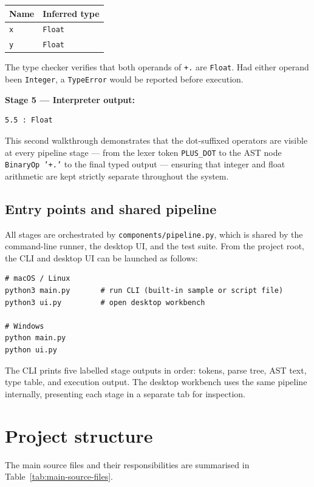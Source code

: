 \begin{table}[H]
\centering
\small
\begin{tabular}{@{} ll @{}}
\toprule
\textbf{Name} & \textbf{Inferred type} \\
\midrule
\texttt{x} & \texttt{Float} \\
\texttt{y} & \texttt{Float} \\
\bottomrule
\end{tabular}
\end{table}

\noindent The type checker verifies that both operands of \texttt{+.} are
\texttt{Float}. Had either operand been \texttt{Integer}, a \texttt{TypeError}
would be reported before execution.

\textbf{Stage 5 --- Interpreter output:}
\begin{lstlisting}
5.5 : Float
\end{lstlisting}

This second walkthrough demonstrates that the dot-suffixed operators are visible
at every pipeline stage --- from the lexer token \texttt{PLUS\_DOT} to the AST
node \texttt{BinaryOp '+.'} to the final typed output --- ensuring that integer
and float arithmetic are kept strictly separate throughout the system.

\subsection{Entry points and shared pipeline}
All stages are orchestrated by \texttt{components/pipeline.py}, which is shared
by the command-line runner, the desktop UI, and the test suite.
From the project root, the CLI and desktop UI can be launched as follows:

\begin{lstlisting}
# macOS / Linux
python3 main.py       # run CLI (built-in sample or script file)
python3 ui.py         # open desktop workbench

# Windows
python main.py
python ui.py
\end{lstlisting}

\noindent The CLI prints five labelled stage outputs in order: tokens, parse
tree, AST text, type table, and execution output. The desktop workbench uses the same pipeline
internally, presenting each stage in a separate tab for inspection.

\section{Project structure}
The main source files and their responsibilities are summarised in
Table~\ref{tab:main-source-files}.

